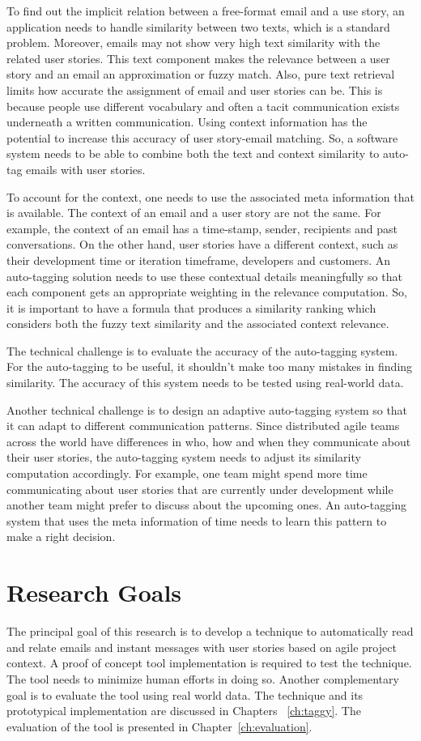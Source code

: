 To find out the implicit relation between a free-format email and a use story, an application needs to handle similarity between two texts, which is a standard problem. Moreover, emails may not show very high text similarity with the related user stories. This text component makes the relevance between a user story and an email an approximation or fuzzy match. Also, pure text retrieval limits how accurate the assignment of email and user stories can be. This is because people use different vocabulary and often a tacit communication exists underneath a written communication. Using context information has the potential to increase this accuracy of user story-email matching. So, a software system needs to be able to combine both the text and context similarity to auto-tag emails with user stories.

To account for the context, one needs to use the associated meta information that is available. The context of an email and a user story are not the same. For example, the context of an email has a time-stamp, sender, recipients and past conversations. On the other hand, user stories have a different context, such as their development time or iteration timeframe, developers and customers. An auto-tagging solution needs to use these contextual details meaningfully so that each component gets an appropriate weighting in the relevance computation. So, it is important to have a formula that produces a similarity ranking which considers both the fuzzy text similarity and the associated context relevance.

The technical challenge is to evaluate the accuracy of the auto-tagging system. For the auto-tagging to be useful, it shouldn't make too many mistakes in finding similarity. The accuracy of this system needs to be tested using real-world data. 

Another technical challenge is to design an adaptive auto-tagging system so that it can adapt to different communication patterns. Since distributed agile teams across the world have differences in who, how and when they communicate about their user stories, the auto-tagging system needs to adjust its similarity computation accordingly. For example, one team might spend more time communicating about user stories that are currently under development while another team might prefer to discuss about the upcoming ones. An auto-tagging system that uses the meta information of time needs to learn this pattern to make a right decision.


\section{Research Goals}
The principal goal of this research is to develop a technique to automatically read and relate emails and instant messages with user stories based on agile project context. A proof of concept tool implementation is required to test the technique. The tool needs to minimize human efforts in doing so. Another complementary goal is to evaluate the tool using real world data. The technique and its prototypical implementation are discussed in Chapters ~\ref{ch:taggy}. The evaluation of the tool is presented in Chapter~\ref{ch:evaluation}.

